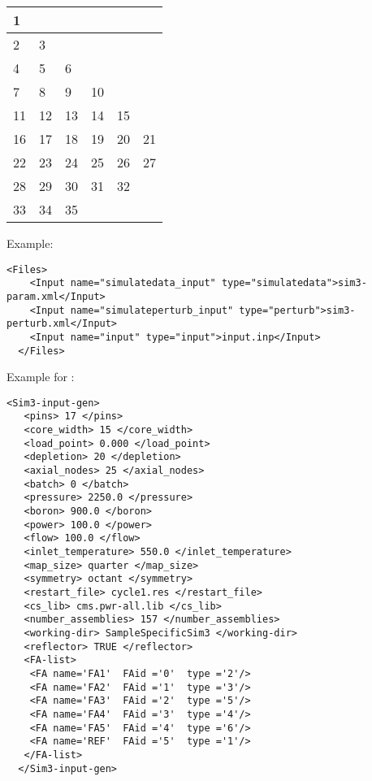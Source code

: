 \begin{center}
  \begin{tabular}{ |p{0.5cm}|p{0.5cm}|p{0.5cm}|p{0.5cm}|p{0.5cm}|p{0.5cm}| } 
    \hline
    1& & & & &       \\ 
    \hline
    2&3& & & &        \\ 
    \hline
    4&5&6& & &        \\ 
    \hline
    7&8&9&10& &       \\ 
    \hline
    11&12&13&14&15&   \\ 
    \hline
    16&17&18&19&20&21  \\ 
    \hline
    22&23&24&25&26&27 \\ 
    \hline
    28&29&30&31&32&    \\ 
    \hline
    33&34&35&  &  &   \\ 
    \hline
  \end{tabular}
\end{center}
  
Example:
  \begin{lstlisting}[style=XML]
  <Files>
    <Input name="simulatedata_input" type="simulatedata">sim3-param.xml</Input>
    <Input name="simulateperturb_input" type="perturb">sim3-perturb.xml</Input>
    <Input name="input" type="input">input.inp</Input>
  </Files>
  \end{lstlisting}
Example for :
  \begin{lstlisting}[style=XML]
  <Sim3-input-gen>
   <pins> 17 </pins>
   <core_width> 15 </core_width>
   <load_point> 0.000 </load_point>
   <depletion> 20 </depletion>
   <axial_nodes> 25 </axial_nodes>
   <batch> 0 </batch>
   <pressure> 2250.0 </pressure>
   <boron> 900.0 </boron>
   <power> 100.0 </power>
   <flow> 100.0 </flow>
   <inlet_temperature> 550.0 </inlet_temperature>
   <map_size> quarter </map_size>
   <symmetry> octant </symmetry>
   <restart_file> cycle1.res </restart_file>
   <cs_lib> cms.pwr-all.lib </cs_lib>
   <number_assemblies> 157 </number_assemblies>
   <working-dir> SampleSpecificSim3 </working-dir>
   <reflector> TRUE </reflector>
   <FA-list>
    <FA name='FA1'  FAid ='0'  type ='2'/>
    <FA name='FA2'  FAid ='1'  type ='3'/>
    <FA name='FA3'  FAid ='2'  type ='5'/>
    <FA name='FA4'  FAid ='3'  type ='4'/>
    <FA name='FA5'  FAid ='4'  type ='6'/>
    <FA name='REF'  FAid ='5'  type ='1'/>
   </FA-list>
  </Sim3-input-gen>
  \end{lstlisting}

